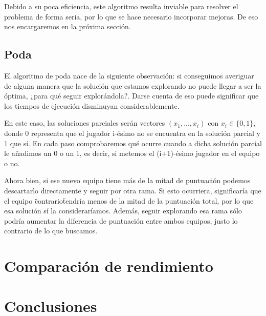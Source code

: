 \documentclass[a4paper, 11pt]{article}
\begin{document}
Debido a su poca eficiencia, este algoritmo resulta inviable para resolver el problema de forma seria, por lo que se hace necesario incorporar mejoras. De eso nos encargaremos en la próxima sección.

\subsection{Poda}
El algoritmo de poda nace de la siguiente observación: si conseguimos averiguar de alguna manera que la solución que estamos explorando no puede llegar a ser la óptima, ¿para qué seguir explorándola?. Darse cuenta de eso puede significar que los tiempos de ejecución disminuyan considerablemente.

En este caso, las soluciones parciales serán vectores $(x_1, ..., x_i)$ con
$x_i \in \{0, 1\}$, donde 0 representa que el jugador i-ésimo no se encuentra en la solución parcial
y 1 que sí. En cada paso comprobaremos qué ocurre cuando a dicha solución parcial le añadimos un 0
o un 1, es decir, si metemos el (i+1)-ésimo jugador en el equipo o no. 

Ahora bien, si ese nuevo equipo tiene más de la mitad de puntuación podemos descartarlo directamente
y seguir por otra rama. Si esto ocurriera, significaría que el equipo \"contrario\" tendría menos de la 
mitad de la puntuación total, por lo que esa solución sí la consideraríamos. Además, seguir explorando esa 
rama sólo podría aumentar la diferencia de puntuación entre ambos equipos, justo lo contrario de lo
que buscamos.

\section{Comparación de rendimiento}

\section{Conclusiones}
\end{document}
